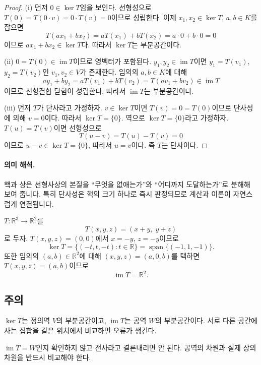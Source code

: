 \begin{proof}
(i) 먼저 $0\in\ker T$임을 보인다. 선형성으로 $T(0)=T(0\cdot v)=0\cdot T(v)=0$이므로 성립한다.  
이제 $x_1,x_2\in\ker T$, $a,b\in K$를 잡으면
\[
T(ax_1+bx_2)=aT(x_1)+bT(x_2)=a\cdot 0+b\cdot 0=0
\]
이므로 $ax_1+bx_2\in\ker T$다. 따라서 $\ker T$는 부분공간이다.

(ii) $0=T(0)\in\operatorname{im}T$이므로 영벡터가 포함된다.  
$y_1,y_2\in\operatorname{im}T$이면 $y_1=T(v_1)$, $y_2=T(v_2)$인 $v_1,v_2\in V$가 존재한다. 임의의 $a,b\in K$에 대해
\[
ay_1+by_2=aT(v_1)+bT(v_2)=T(av_1+bv_2)\in\operatorname{im}T
\]
이므로 선형결합 닫힘이 성립한다. 따라서 $\operatorname{im}T$는 부분공간이다.

(iii) 먼저 $T$가 단사라고 가정하자. $v\in\ker T$이면 $T(v)=0=T(0)$이므로 단사성에 의해 $v=0$이다. 따라서 $\ker T=\{0\}$.  
역으로 $\ker T=\{0\}$라고 가정하자. $T(u)=T(v)$이면 선형성으로
\[
T(u-v)=T(u)-T(v)=0
\]
이므로 $u-v\in\ker T=\{0\}$, 따라서 $u=v$이다. 즉 $T$는 단사이다.
\end{proof}

\paragraph{의미 해석.}
핵과 상은 선형사상의 본질을 ``무엇을 없애는가''와 ``어디까지 도달하는가''로 분해해 보여 줍니다. 특히 단사성은 핵의 크기 하나로 즉시 판정되므로 계산과 이론이 자연스럽게 연결됩니다.

\begin{example}
$T:\mathbb{R}^3\to\mathbb{R}^2$를
\[
T(x,y,z)=(x+y,\;y+z)
\]
로 두자.  
$T(x,y,z)=(0,0)$에서 $x=-y$, $z=-y$이므로
\[
\ker T=\{(-t,t,-t): t\in\mathbb{R}\}
=\operatorname{span}\{(-1,1,-1)\}.
\]
또한 임의의 $(a,b)\in\mathbb{R}^2$에 대해 $(x,y,z)=(a,0,b)$를 택하면 $T(x,y,z)=(a,b)$이므로
\[
\operatorname{im}T=\mathbb{R}^2.
\]
\end{example}

\subsection*{주의}
\begin{warning}
$\ker T$는 정의역 $V$의 부분공간이고, $\operatorname{im}T$는 공역 $W$의 부분공간이다. 서로 다른 공간에 사는 집합을 같은 위치에서 비교하면 오류가 생긴다.
\end{warning}
\begin{warning}
$\operatorname{im}T=W$인지 확인하지 않고 전사라고 결론내리면 안 된다. 공역의 차원과 실제 상의 차원을 반드시 비교해야 한다.
\end{warning}


